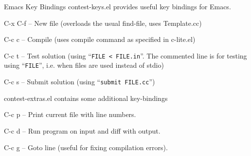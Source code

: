 \begin{algorithm}{Emacs Key Bindings}
\desc
contest-keys.el provides useful key bindings for Emacs.
\begin{description}
\item{C-x C-f} -- New file (overloads the usual find-file, uses Template.cc)
\item{C-c c} -- Compile (uses compile command as specified in c-lite.el)
\item{C-c t} -- Test solution (using ``\texttt{FILE < FILE.in}''. The
commented line is for testing using ``\texttt{FILE}'', i.e. when files
are used instead of stdio)
\item{C-c s} -- Submit solution (using ``\texttt{submit FILE.cc}'')
\end{description}
contest-extras.el contains some additional key-bindings
\begin{description}
\item{C-c p} -- Print current file with line numbers.
\item{C-c d} -- Run program on input and diff with output.
\item{C-c g} -- Goto line (useful for fixing compilation errors).
\end{description}
\end{algorithm}


\begin{sourceslandscape}


\end{sourceslandscape}
